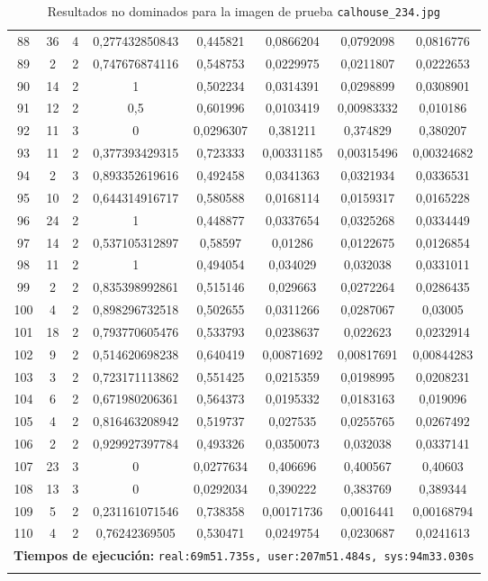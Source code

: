 \begin{longtable}{|c|c|c|c|c|c|c|c|}
88 & 36 & 4 & 0,277432850843 & 0,445821 & 0,0866204 & 0,0792098 & 0,0816776  \\
89 & 2 & 2 & 0,747676874116 & 0,548753 & 0,0229975 & 0,0211807 & 0,0222653  \\
90 & 14 & 2 & 1 & 0,502234 & 0,0314391 & 0,0298899 & 0,0308901  \\
91 & 12 & 2 & 0,5 & 0,601996 & 0,0103419 & 0,00983332 & 0,010186  \\
92 & 11 & 3 & 0 & 0,0296307 & 0,381211 & 0,374829 & 0,380207  \\
93 & 11 & 2 & 0,377393429315 & 0,723333 & 0,00331185 & 0,00315496 & 0,00324682  \\
94 & 2 & 3 & 0,893352619616 & 0,492458 & 0,0341363 & 0,0321934 & 0,0336531  \\
95 & 10 & 2 & 0,644314916717 & 0,580588 & 0,0168114 & 0,0159317 & 0,0165228  \\
96 & 24 & 2 & 1 & 0,448877 & 0,0337654 & 0,0325268 & 0,0334449  \\
97 & 14 & 2 & 0,537105312897 & 0,58597 & 0,01286 & 0,0122675 & 0,0126854  \\
98 & 11 & 2 & 1 & 0,494054 & 0,034029 & 0,032038 & 0,0331011  \\
99 & 2 & 2 & 0,835398992861 & 0,515146 & 0,029663 & 0,0272264 & 0,0286435  \\
100 & 4 & 2 & 0,898296732518 & 0,502655 & 0,0311266 & 0,0287067 & 0,03005  \\
101 & 18 & 2 & 0,793770605476 & 0,533793 & 0,0238637 & 0,022623 & 0,0232914  \\
102 & 9 & 2 & 0,514620698238 & 0,640419 & 0,00871692 & 0,00817691 & 0,00844283  \\
103 & 3 & 2 & 0,723171113862 & 0,551425 & 0,0215359 & 0,0198995 & 0,0208231  \\
104 & 6 & 2 & 0,671980206361 & 0,564373 & 0,0195332 & 0,0183163 & 0,019096  \\
105 & 4 & 2 & 0,816463208942 & 0,519737 & 0,027535 & 0,0255765 & 0,0267492  \\
106 & 2 & 2 & 0,929927397784 & 0,493326 & 0,0350073 & 0,032038 & 0,0337141  \\
107 & 23 & 3 & 0 & 0,0277634 & 0,406696 & 0,400567 & 0,40603  \\
108 & 13 & 3 & 0 & 0,0292034 & 0,390222 & 0,383769 & 0,389344  \\
109 & 5 & 2 & 0,231161071546 & 0,738358 & 0,00171736 & 0,0016441 & 0,00168794  \\
110 & 4 & 2 & 0,76242369505 & 0,530471 & 0,0249754 & 0,0230687 & 0,0241613  \\
\hline
\multicolumn{8}{|c|}{\textbf{Tiempos de ejecución:} \texttt{real:69m51.735s, user:207m51.484s, sys:94m33.030s}}\\  \hline
\caption{Resultados no dominados para la imagen de prueba \texttt{calhouse\_234.jpg}}
\label{tab:calhouse_234}
\end{longtable}
\normalsize

